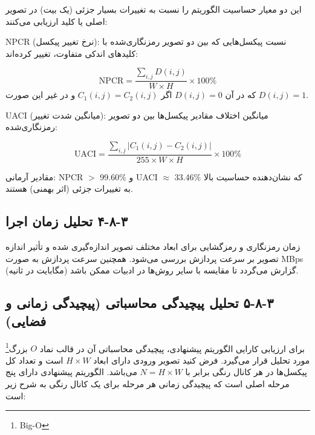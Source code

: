 این دو معیار حساسیت الگوریتم را نسبت به تغییرات بسیار جزئی (یک بیت) در تصویر اصلی یا کلید ارزیابی می‌کنند:

NPCR (نرخ تغییر پیکسل):  نسبت پیکسل‌هایی که بین دو تصویر رمزنگاری‌شده با کلیدهای اندکی متفاوت، تغییر کرده‌اند:

\begin{equation}
\mathrm{NPCR} = \frac{\sum_{i,j} D(i,j)}{W \times H} \times 100\%

\end{equation}
که در آن $D(i,j)=0$ اگر $C_1(i,j)=C_2(i,j)$ و در غیر این صورت $D(i,j)=1$.

UACI (میانگین شدت تغییر): میانگین اختلاف مقادیر پیکسل‌ها بین دو تصویر رمزنگاری‌شده:

\begin{equation}
\mathrm{UACI} = \frac{\sum_{i,j} \left|C_1(i,j)-C_2(i,j)\right|}{255 \times W \times H} \times 100\%

\end{equation}

مقادیر آرمانی: NPCR $>$ 99.60\% و UACI $\approx$ 33.46\% که نشان‌دهنده حساسیت بالا به تغییرات جزئی (اثر بهمنی) هستند\cite{ref10}.

\subsection{‏۳‏-‏۸‏-‏۴‏ تحلیل زمان اجرا}

زمان رمزنگاری و رمزگشایی برای ابعاد مختلف تصویر اندازه‌گیری شده و تأثیر اندازه تصویر بر سرعت پردازش بررسی می‌شود. همچنین سرعت پردازش به صورت MBps (مگابایت در ثانیه) گزارش می‌گردد تا مقایسه با سایر روش‌ها در ادبیات ممکن باشد.

\subsection{‏۳‏-‏۸‏-‏۵‏ تحلیل پیچیدگی محاسباتی (پیچیدگی زمانی و فضایی)}

برای ارزیابی کارایی الگوریتم پیشنهادی، پیچیدگی محاسباتی آن در قالب نماد $O$ بزرگ\footnote{Big-O} مورد تحلیل قرار می‌گیرد. فرض کنید تصویر ورودی دارای ابعاد $H \times W$ است و تعداد کل پیکسل‌ها در هر کانال رنگی برابر با $N = H \times W$ می‌باشد. الگوریتم پیشنهادی دارای پنج مرحله اصلی است که پیچیدگی زمانی هر مرحله برای یک کانال رنگی به شرح زیر است:

